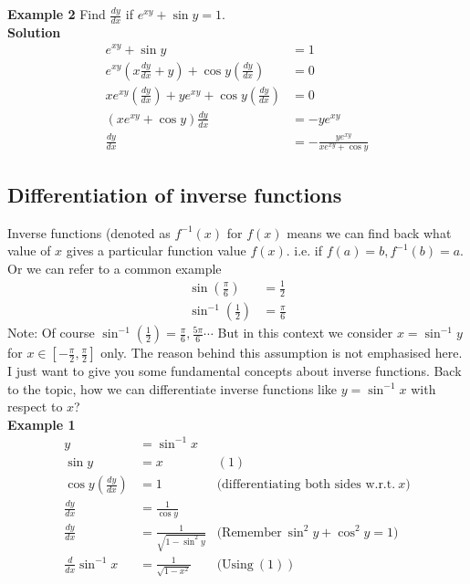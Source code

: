 \documentclass{article}
\begin{document}
\clearpage
\pagebreak
\noindent\textbf{Example 2}
Find $\displaystyle\frac{dy}{dx}$ if $e^{xy}+\sin{y}=1$.\\
\textbf{Solution}\\
\begin{equation*}
\begin{aligned}
    e^{xy} +\sin y & =1\\
    e^{xy}\left( x\frac{dy}{dx} +y\right) +\cos y\left(\frac{dy}{dx}\right) & =0\\
    xe^{xy}\left(\frac{dy}{dx}\right) +ye^{xy} +\cos y\left(\frac{dy}{dx}\right) & =0\\
    \left( xe^{xy} +\cos y\right)\frac{dy}{dx} & =-ye^{xy}\\
    \frac{dy}{dx} & =-\frac{ye^{xy}}{xe^{xy} +\cos y}
\end{aligned}
\end{equation*}
\subsection{Differentiation of inverse functions}
Inverse functions (denoted as $\displaystyle f^{-1}( x)$
for $f(x)$ means we can find back what value of $x$ gives
a particular function value $f(x)$. i.e.
if $f(a)=b,f^{-1}(b)=a$. Or we can refer to a common example
\begin{equation*}
\begin{aligned}
    \sin\left(\frac{\pi }{6}\right) & =\frac{1}{2}\\
    \sin^{-1}\left(\frac{1}{2}\right) & =\frac{\pi }{6}
\end{aligned}
\end{equation*}
Note: Of course $\displaystyle \sin^{-1}\left(\frac{1}{2}\right) =\frac{\pi }{6} ,\frac{5\pi }{6} \cdots $
But in this context we consider $\displaystyle x=\sin^{-1} y$
for $\displaystyle x\in \left[ -\frac{\pi }{2} ,\frac{\pi }{2}\right]$
only. The reason behind this assumption is
not emphasised here. I just want to give
you some fundamental concepts about
inverse functions.
Back to the topic, how we can differentiate
inverse functions like $\displaystyle y=\sin^{-1} x$
with respect to $x$?\\
\textbf{Example 1}
\begin{equation*}
\begin{aligned}
    y & =\sin^{-1} x & \\
    \sin y & =x & ( 1)\\
    \cos y\left(\frac{dy}{dx}\right) & =1 & \text{(differentiating both sides w.r.t.} \ x\text{)}\\
    \frac{dy}{dx} & =\frac{1}{\cos y} & \\
    \frac{dy}{dx} & =\frac{1}{\sqrt{1-\sin^{2} y}} & \text{(Remember} \ \sin^{2} y+\cos^{2} y=1\text{)}\\
    \frac{d}{dx}\sin^{-1} x & =\frac{1}{\sqrt{1-x^{2}}} & \text{(Using} \ ( 1) \ \text{)}
\end{aligned}
\end{equation*}
\clearpage
\pagebreak
\end{document}
